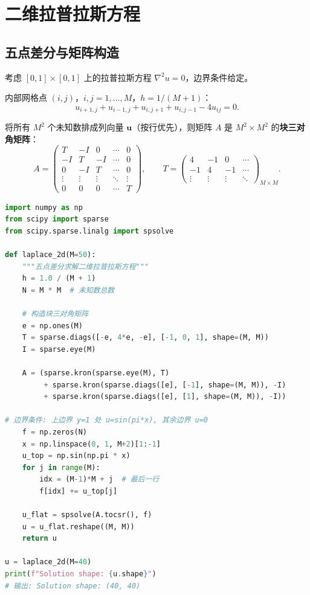 \section{二维拉普拉斯方程}
\label{sec:laplace2d}

\subsection{五点差分与矩阵构造}

考虑 $[0,1]\times[0,1]$ 上的拉普拉斯方程 $\nabla^2 u = 0$，边界条件给定。

内部网格点 $(i,j)$，$i,j=1,\dots,M$，$h=1/(M+1)$：
\begin{equation}
u_{i+1,j} + u_{i-1,j} + u_{i,j+1} + u_{i,j-1} - 4u_{ij} = 0.
\label{eq:laplace2d_discrete}
\end{equation}

将所有 $M^2$ 个未知数排成列向量 $\mathbf{u}$（按行优先），则矩阵 $A$ 是 $M^2\times M^2$ 的\textbf{块三对角矩阵}：
\begin{equation}
A = \begin{pmatrix}
T & -I & 0 & \cdots & 0 \\
-I & T & -I & \cdots & 0 \\
0 & -I & T & \cdots & 0 \\
\vdots & \vdots & \vdots & \ddots & \vdots \\
0 & 0 & 0 & \cdots & T
\end{pmatrix},\qquad
T = \begin{pmatrix}
4 & -1 & 0 & \cdots \\
-1 & 4 & -1 & \cdots \\
\vdots & \vdots & \vdots & \ddots
\end{pmatrix}_{M\times M}.
\label{eq:block_tridiag}
\end{equation}

\begin{lstlisting}[language=Python, caption=二维拉普拉斯方程的有限差分]
import numpy as np
from scipy import sparse
from scipy.sparse.linalg import spsolve

def laplace_2d(M=50):
    """五点差分求解二维拉普拉斯方程"""
    h = 1.0 / (M + 1)
    N = M * M  # 未知数总数

    # 构造块三对角矩阵
    e = np.ones(M)
    T = sparse.diags([-e, 4*e, -e], [-1, 0, 1], shape=(M, M))
    I = sparse.eye(M)

    A = (sparse.kron(sparse.eye(M), T)
         + sparse.kron(sparse.diags([e], [-1], shape=(M, M)), -I)
         + sparse.kron(sparse.diags([e], [1], shape=(M, M)), -I))

# 边界条件: 上边界 y=1 处 u=sin(pi*x), 其余边界 u=0
    f = np.zeros(N)
    x = np.linspace(0, 1, M+2)[1:-1]
    u_top = np.sin(np.pi * x)
    for j in range(M):
        idx = (M-1)*M + j  # 最后一行
        f[idx] += u_top[j]

    u_flat = spsolve(A.tocsr(), f)
    u = u_flat.reshape((M, M))
    return u

u = laplace_2d(M=40)
print(f"Solution shape: {u.shape}")
# 输出: Solution shape: (40, 40)
\end{lstlisting}

